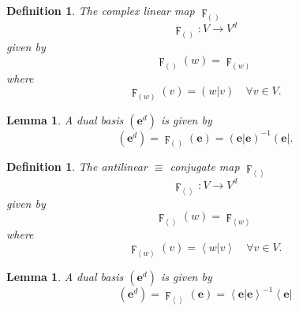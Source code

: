 \documentclass[aps,preprint]{revtex4}%
\newtheorem{definition}[theorem]{Definition}
\newtheorem{lemma}[theorem]{Lemma}
\begin{document}
\begin{definition}
The complex linear map $\digamma_{\left(  {}\right)  }$
\begin{equation}
\digamma_{\left(  {}\right)  }:V\rightarrow V^{d}%
\end{equation}
given by%
\begin{equation}
\digamma_{\left(  {}\right)  }\left(  w\right)  =\digamma_{\left(  w\right)  }%
\end{equation}
where%
\begin{equation}
\digamma_{\left(  w\right)  }\left(  v\right)  =\left(  \left.  w\right\vert
v\right)  \quad\forall v\in V.
\end{equation}

\end{definition}

\begin{lemma}
A dual basis $\left(  \mathbf{e}^{d}\right)  $ is given by
\begin{equation}
\left(  \mathbf{e}^{d}\right)  =\digamma_{\left(  {}\right)  }\left(
\mathbf{e}\right)  =\left(  \left.  \mathbf{e}\right\vert \mathbf{e}\right)
^{-1}\left(  \mathbf{e}\right\vert .
\end{equation}

\end{lemma}

\begin{definition}
The antilinear $\equiv$ conjugate map $\digamma_{\left\langle {}\right\rangle
}$%
\begin{equation}
\digamma_{\left\langle {}\right\rangle }:V\rightarrow V^{d}%
\end{equation}
given by%
\begin{equation}
\digamma_{\left\langle {}\right\rangle }\left(  w\right)  =\digamma
_{\left\langle w\right\rangle }%
\end{equation}
where%
\begin{equation}
\digamma_{\left\langle w\right\rangle }\left(  v\right)  =\left\langle \left.
w\right\vert v\right\rangle \quad\forall v\in V.
\end{equation}

\end{definition}

\begin{lemma}
A dual basis $\left(  \mathbf{e}^{d}\right)  $ is given by
\begin{equation}
\left(  \mathbf{e}^{d}\right)  =\digamma_{\left\langle {}\right\rangle
}\left(  \mathbf{e}\right)  =\left\langle \left.  \mathbf{e}\right\vert
\mathbf{e}\right\rangle ^{-1}\left\langle \mathbf{e}\right\vert
\end{equation}

\end{lemma}
\end{document}
